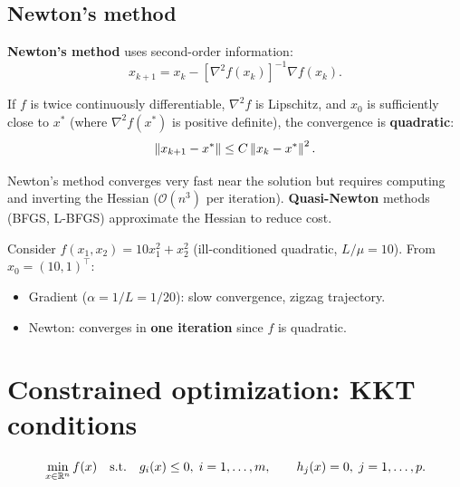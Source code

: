 \subsection{Newton's method}

\begin{definition}
\textbf{Newton's method} uses second-order information:
\[
  x_{k+1} = x_k - [\nabla^2 f(x_k)]^{-1} \nabla f(x_k).
\]
\end{definition}

\begin{theorem}
If $f$ is twice continuously differentiable, $\nabla^2 f$ is Lipschitz, and
$x_0$ is sufficiently close to $x^*$ (where $\nabla^2 f(x^*)$ is positive
definite), the convergence is \textbf{quadratic}:
\[
  \left\| x_{k+1} - x^* \right\| \leq C \left\| x_k - x^* \right\|^2.
\]
\end{theorem}

\begin{remark}
Newton's method converges very fast near the solution but requires computing
and inverting the Hessian ($\mathcal{O}(n^3)$ per iteration).
\textbf{Quasi-Newton} methods (BFGS, L-BFGS) approximate the Hessian to
reduce cost.
\end{remark}

\begin{example}
Consider $f(x_1, x_2) = 10x_1^2 + x_2^2$ (ill-conditioned quadratic,
$L/\mu = 10$). From $x_0 = (10, 1)^\top$:
\begin{itemize}
  \item Gradient ($\alpha = 1/L = 1/20$): slow convergence, zigzag
        trajectory.
  \item Newton: converges in \textbf{one iteration} since $f$ is quadratic.
\end{itemize}
\end{example}

\section{Constrained optimization: KKT conditions}

\begin{definition}
\[
  \min_{x \in \mathbb{R}^n} f(x) \quad \text{s.t.} \quad
  g_i(x) \leq 0,\; i = 1,\ldots,m, \qquad
  h_j(x) = 0,\; j = 1,\ldots,p.
\]
\end{definition}

